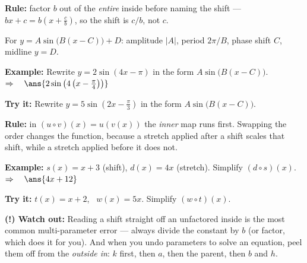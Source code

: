 \documentclass[12pt]{article}
\begin{document}

\begin{formulabox}
\textbf{Rule:} factor $b$ out of the \emph{entire} inside before naming the shift ---
$bx + c = b\left(x + \frac{c}{b}\right)$, so the shift is $c/b$, not $c$.\par
For $y = A\sin\bigl(B(x - C)\bigr) + D$: amplitude $|A|$, period $2\pi/B$, phase shift $C$,
midline $y = D$.
\end{formulabox}

\begin{examplebox}
\textbf{Example:} \quad Rewrite $y = 2\sin\left(4x - \pi\right)$ in the form $A\sin\bigl(B(x - C)\bigr)$.
$\Rightarrow\quad \ans{2\sin\left(4\left(x - \tfrac{\pi}{4}\right)\right)}$
\end{examplebox}

\begin{tryitbox}
\textbf{Try it:} \quad Rewrite $y = 5\sin\left(2x - \tfrac{\pi}{3}\right)$ in the form $A\sin\bigl(B(x - C)\bigr)$.\\[2pt]
\end{tryitbox}


\begin{formulabox}
\textbf{Rule:} in $(u \circ v)(x) = u(v(x))$ the \emph{inner} map runs first. Swapping the
order changes the function, because a stretch applied after a shift scales that shift, while
a stretch applied before it does not.
\end{formulabox}

\begin{examplebox}
\textbf{Example:} \quad $s(x) = x + 3$ (shift), $d(x) = 4x$ (stretch). Simplify $(d \circ s)(x)$.
$\Rightarrow\quad \ans{4x + 12}$
\end{examplebox}

\begin{tryitbox}
\textbf{Try it:} \quad $t(x) = x + 2$, \ $w(x) = 5x$. Simplify $(w \circ t)(x)$.\\[2pt]
\end{tryitbox}

\begin{watchoutbox}
\textbf{(!) Watch out:} Reading a shift straight off an unfactored inside is the most common
multi-parameter error --- always divide the constant by $b$ (or factor, which does it for
you). And when you undo parameters to solve an equation, peel them off from the
\emph{outside in}: $k$ first, then $a$, then the parent, then $b$ and $h$.
\end{watchoutbox}
\end{document}
